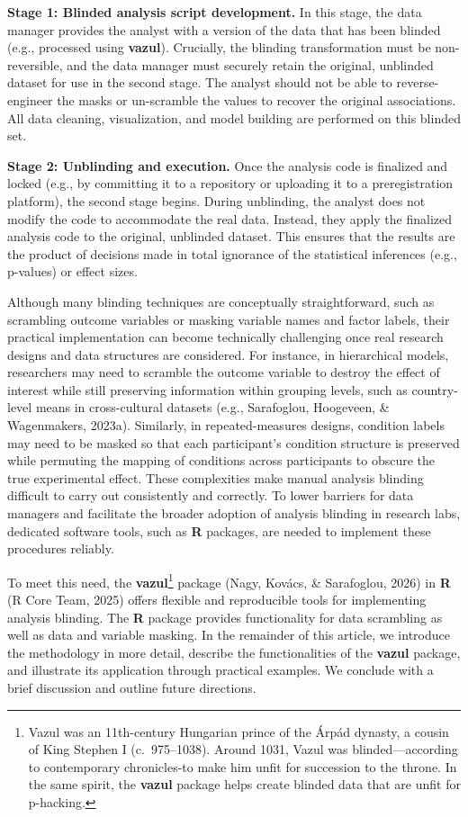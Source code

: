 \documentclass[
  english,
  man,floatsintext]{apa6}
\begin{document}
\textbf{Stage 1: Blinded analysis script development.} In this stage, the data manager provides the analyst with a version of the data that has been blinded (e.g., processed using \textbf{vazul}). Crucially, the blinding transformation must be non-reversible, and the data manager must securely retain the original, unblinded dataset for use in the second stage. The analyst should not be able to reverse-engineer the masks or un-scramble the values to recover the original associations. All data cleaning, visualization, and model building are performed on this blinded set.

\textbf{Stage 2: Unblinding and execution.} Once the analysis code is finalized and locked (e.g., by committing it to a repository or uploading it to a preregistration platform), the second stage begins. During unblinding, the analyst does not modify the code to accommodate the real data. Instead, they apply the finalized analysis code to the original, unblinded dataset. This ensures that the results are the product of decisions made in total ignorance of the statistical inferences (e.g., p-values) or effect sizes.

Although many blinding techniques are conceptually straightforward, such as scrambling outcome variables or masking variable names and factor labels, their practical implementation can become technically challenging once real research designs and data structures are considered. For instance, in hierarchical models, researchers may need to scramble the outcome variable to destroy the effect of interest while still preserving information within grouping levels, such as country-level means in cross-cultural datasets (e.g., Sarafoglou, Hoogeveen, \& Wagenmakers, 2023a). Similarly, in repeated-measures designs, condition labels may need to be masked so that each participant's condition structure is preserved while permuting the mapping of conditions across participants to obscure the true experimental effect. These complexities make manual analysis blinding difficult to carry out consistently and correctly. To lower barriers for data managers and facilitate the broader adoption of analysis blinding in research labs, dedicated software tools, such as \textbf{R} packages, are needed to implement these procedures reliably.

To meet this need, the \textbf{vazul}\footnote{Vazul was an 11th-century Hungarian prince of the Árpád dynasty, a cousin of King Stephen I (c.~975--1038). Around 1031, Vazul was blinded---according to contemporary chronicles-to make him unfit for succession to the throne. In the same spirit, the \textbf{vazul} package helps create blinded data that are unfit for p-hacking.} package (Nagy, Kovács, \& Sarafoglou, 2026) in \textbf{R} (R Core Team, 2025) offers flexible and reproducible tools for implementing analysis blinding. The \textbf{R} package provides functionality for data scrambling as well as data and variable masking. In the remainder of this article, we introduce the methodology in more detail, describe the functionalities of the \textbf{vazul} package, and illustrate its application through practical examples. We conclude with a brief discussion and outline future directions.
\end{document}
